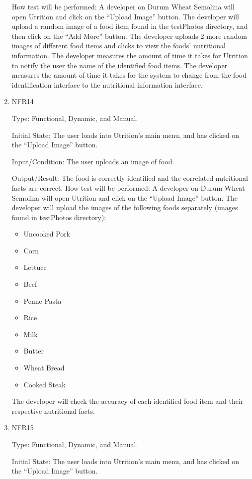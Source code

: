\documentclass[12pt, titlepage]{article}
\begin{document}
\begin{enumerate}
How test will be performed: A developer on Durum Wheat Semolina will open Utrition and click on the “Upload Image” button. The developer will upload a random image of a food item found in the testPhotos directory, and then click on the “Add More” button. The developer uploads 2 more random images of different food items and clicks to view the foods’ nutritional information. The developer measures the amount of time it takes for Utrition to notify the user the name of the identified food items. The developer measures the amount of time it takes for the system to change from the food identification interface to the nutritional information interface.

\item{NFR14\\} 

Type: Functional, Dynamic, and Manual.

Initial State: The user loads into Utrition’s main menu, and has clicked on the “Upload Image” 
button.

Input/Condition: The user uploads an image of food.

Output/Result: The food is correctly identified and the correlated nutritional facts are correct.
How test will be performed: A developer on Durum Wheat Semolina will open Utrition and click on the “Upload Image” button. The developer will upload the images of the following foods separately (images found in testPhotos directory):
\begin{itemize}
	\item Uncooked Pork
	\item Corn
	\item Lettuce
	\item Beef
	\item Penne Pasta
	\item Rice
	\item Milk
	\item Butter
	\item Wheat Bread
	\item Cooked Steak
\end{itemize} 

The developer will check the accuracy of each identified food item and their respective nutritional facts.

\item{NFR15\\} 

Type: Functional, Dynamic, and Manual.

Initial State: The user loads into Utrition’s main menu, and has clicked on the “Upload Image” button.


\end{enumerate}
\end{document}
